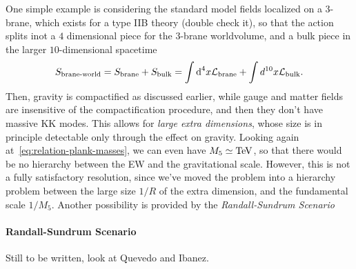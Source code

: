 One simple example is considering the standard model fields localized on a $3$-brane, which exists for a type IIB theory (double check it), so that the action splits inot a $4$ dimensional piece for the $3$-brane worldvolume, and a bulk piece in the larger $10$-dimensional spacetime
\begin{equation}
    S_\textup{brane-world} = S_\textup{brane} + S_\textup{bulk} = \int {\mathop{}\!\mathrm{d}}^4 x \mathcal{L}_\textup{brane} + \int d^{10} x \mathcal{L}_\textup{bulk} .
\end{equation}
Then, gravity is compactified as discussed earlier, while gauge and matter fields are insensitive of the compactification procedure, and then they don't have massive KK modes. This allows for \emph{large extra dimensions}, whose size is in principle detectable only through the effect on gravity. Looking again at~\eqref{eq:relation-plank-masses}, we can even have $M_5 \simeq \textup{TeV}$, so that there would be no hierarchy between the EW and the gravitational scale. However, this is not a fully satisfactory resolution, since we've moved the problem into a hierarchy problem between the large size $1/R$ of the extra dimension, and the fundamental scale $1/M_5$. Another possibility is provided by the \emph{Randall-Sundrum Scenario}

\paragraph{Randall-Sundrum Scenario}
Still to be written, look at Quevedo and Ibanez.